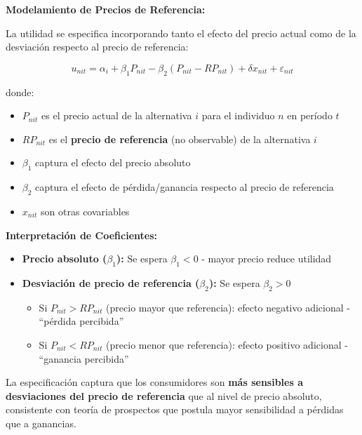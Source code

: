 \documentclass[
]{book}
\providecommand{\tightlist}{%
  \setlength{\itemsep}{0pt}\setlength{\parskip}{0pt}}
\begin{document}
\textbf{Modelamiento de Precios de Referencia:}

La utilidad se especifica incorporando tanto el efecto del precio actual como de la desviación respecto al precio de referencia:

\begin{equation}
u_{nit} = \alpha_i + \beta_1 P_{nit} - \beta_2(P_{nit} - RP_{nit}) + \delta x_{nit} + \varepsilon_{nit}
\label{eq:utilrefprice}
\end{equation}

donde:

\begin{itemize}
\tightlist
\item
  \(P_{nit}\) es el precio actual de la alternativa \(i\) para el individuo \(n\) en período \(t\)
\item
  \(RP_{nit}\) es el \textbf{precio de referencia} (no observable) de la alternativa \(i\)
\item
  \(\beta_1\) captura el efecto del precio absoluto
\item
  \(\beta_2\) captura el efecto de pérdida/ganancia respecto al precio de referencia
\item
  \(x_{nit}\) son otras covariables
\end{itemize}

\textbf{Interpretación de Coeficientes:}

\begin{itemize}
\tightlist
\item
  \textbf{Precio absoluto (\(\beta_1\)):} Se espera \(\beta_1 < 0\) - mayor precio reduce utilidad
\item
  \textbf{Desviación de precio de referencia (\(\beta_2\)):} Se espera \(\beta_2 > 0\)

  \begin{itemize}
  \tightlist
  \item
    Si \(P_{nit} > RP_{nit}\) (precio mayor que referencia): efecto negativo adicional - ``pérdida percibida''
  \item
    Si \(P_{nit} < RP_{nit}\) (precio menor que referencia): efecto positivo adicional - ``ganancia percibida''
  \end{itemize}
\end{itemize}

La especificación captura que los consumidores son \textbf{más sensibles a desviaciones del precio de referencia} que al nivel de precio absoluto, consistente con teoría de prospectos que postula mayor sensibilidad a pérdidas que a ganancias.
\end{document}
